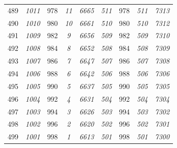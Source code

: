 \documentclass[10pt,fleqn]{article}
\begin{document}
\begin{longtable}{c|cccccccc}
489 & {\color{blue} \it 1011 \rm} & {\color{black} 978} & {\color{blue} \it 11 \rm} & {\color{blue} \it 6665 \rm} & {\color{blue} \it 511 \rm} & {\color{black} 978} & {\color{blue} \it 511 \rm} & {\color{blue} \it 7313 \rm} \\
490 & {\color{blue} \it 1010 \rm} & {\color{black} 980} & {\color{blue} \it 10 \rm} & {\color{blue} \it 6661 \rm} & {\color{blue} \it 510 \rm} & {\color{black} 980} & {\color{blue} \it 510 \rm} & {\color{blue} \it 7312 \rm} \\
491 & {\color{blue} \it 1009 \rm} & {\color{black} 982} & {\color{blue} \it 9 \rm} & {\color{blue} \it 6656 \rm} & {\color{blue} \it 509 \rm} & {\color{black} 982} & {\color{blue} \it 509 \rm} & {\color{blue} \it 7310 \rm} \\
492 & {\color{blue} \it 1008 \rm} & {\color{black} 984} & {\color{blue} \it 8 \rm} & {\color{blue} \it 6652 \rm} & {\color{blue} \it 508 \rm} & {\color{black} 984} & {\color{blue} \it 508 \rm} & {\color{blue} \it 7309 \rm} \\
493 & {\color{blue} \it 1007 \rm} & {\color{black} 986} & {\color{blue} \it 7 \rm} & {\color{blue} \it 6647 \rm} & {\color{blue} \it 507 \rm} & {\color{black} 986} & {\color{blue} \it 507 \rm} & {\color{blue} \it 7308 \rm} \\
494 & {\color{blue} \it 1006 \rm} & {\color{black} 988} & {\color{blue} \it 6 \rm} & {\color{blue} \it 6642 \rm} & {\color{blue} \it 506 \rm} & {\color{black} 988} & {\color{blue} \it 506 \rm} & {\color{blue} \it 7306 \rm} \\
495 & {\color{blue} \it 1005 \rm} & {\color{black} 990} & {\color{blue} \it 5 \rm} & {\color{blue} \it 6637 \rm} & {\color{blue} \it 505 \rm} & {\color{black} 990} & {\color{blue} \it 505 \rm} & {\color{blue} \it 7305 \rm} \\
496 & {\color{blue} \it 1004 \rm} & {\color{black} 992} & {\color{blue} \it 4 \rm} & {\color{blue} \it 6631 \rm} & {\color{blue} \it 504 \rm} & {\color{black} 992} & {\color{blue} \it 504 \rm} & {\color{blue} \it 7304 \rm} \\
497 & {\color{blue} \it 1003 \rm} & {\color{black} 994} & {\color{blue} \it 3 \rm} & {\color{blue} \it 6626 \rm} & {\color{blue} \it 503 \rm} & {\color{black} 994} & {\color{blue} \it 503 \rm} & {\color{blue} \it 7302 \rm} \\
498 & {\color{blue} \it 1002 \rm} & {\color{black} 996} & {\color{blue} \it 2 \rm} & {\color{blue} \it 6620 \rm} & {\color{blue} \it 502 \rm} & {\color{black} 996} & {\color{blue} \it 502 \rm} & {\color{blue} \it 7301 \rm} \\
499 & {\color{blue} \it 1001 \rm} & {\color{black} 998} & {\color{blue} \it 1 \rm} & {\color{blue} \it 6613 \rm} & {\color{blue} \it 501 \rm} & {\color{black} 998} & {\color{blue} \it 501 \rm} & {\color{blue} \it 7300 \rm}
\end{longtable}
\end{document}
